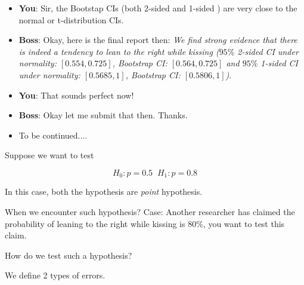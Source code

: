 \documentclass{beamer}\usepackage[]{graphicx}\usepackage[]{color}
\begin{document}
\begin{frame}

\begin{itemize}
\item \textbf{You}: Sir, the Bootstap CIs (both 2-sided and 1-sided ) are very close to the normal or t-distribution CIs.  \pause

\item \textbf{Boss}: Okay, here is the final report then: \textit{We find strong evidence that there is indeed a tendency to lean to the right while kissing ($95 \%$ 2-sided CI under normality: $ [ 0.554, 0.725 ] $, Bootstrap CI: $[0.564, 0.725]$  and $95 \%$ 1-sided CI under normality: $ [ 0.5685, 1] $, Bootstrap CI: $[0.5806, 1]$)}. \pause

\item \textbf{You}: That sounds perfect now! \pause

\item \textbf{Boss}: Okay let me submit that then. Thanks. \pause

\item To be continued....

\end{itemize}

\end{frame}

\begin{frame}

Suppose we want to test

$$ H_{0}: p=0.5 \; \; H_{1}: p = 0.8 $$ \pause

In this case, both the hypothesis are \textit{point} hypothesis. \pause

When we encounter such hypothesis? Case: Another researcher has claimed the probability of leaning to the right while kissing is $80 \%$, you want to test this claim.

How do we test such a hypothesis? \pause

We define 2 types of errors. \pause

\end{frame}
\end{document}

